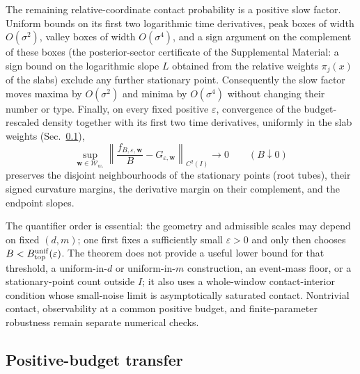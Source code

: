 \documentclass[aps,physrev,reprint,amsmath,amssymb,longbibliography,floatfix]{revtex4-2}
\begin{document}
The remaining relative-coordinate contact probability is a positive slow
factor.  Uniform bounds on its first two logarithmic time derivatives, peak
boxes of width $O(\sigma^2)$, valley boxes of width $O(\sigma^4)$, and a
sign argument on the complement of these boxes (the posterior-sector
certificate of the Supplemental Material: a sign bound on the logarithmic
slope $L$ obtained from the relative weights $\pi_j(x)$ of the slabs)
exclude any further stationary point.  Consequently the slow factor moves maxima by $O(\sigma^2)$ and
minima by $O(\sigma^4)$ without changing their number or type.  Finally, on
every fixed positive $\varepsilon$, convergence of the budget-rescaled
density together with its first two time derivatives, uniformly in the slab
weights (Sec.~\ref{sec:transfer}),
\begin{equation}
 \sup_{\bm w\in\mathcal W_{w_*}}
 \left\|\frac{f_{B,\varepsilon,\bm w}}{B}
       -G_{\varepsilon,\bm w}\right\|_{C^2(I)}
 \longrightarrow0
 \qquad (B\downarrow0)
 \label{eq:exact-m-weak-budget}
\end{equation}
preserves the disjoint neighbourhoods of the stationary points (root
tubes), their signed curvature margins, the derivative margin on their
complement, and the endpoint slopes.

The quantifier order is essential: the geometry and admissible scales may
depend on fixed $(d,m)$; one first fixes a sufficiently small
$\varepsilon>0$ and only then chooses
$B<B_{\rm top}^{\rm unif}(\varepsilon)$.  The theorem does not provide a
useful lower bound for that threshold, a uniform-in-$d$ or uniform-in-$m$
construction, an event-mass floor, or a stationary-point count outside $I$;
it also uses a whole-window contact-interior condition whose small-noise limit
is asymptotically saturated contact.  Nontrivial contact, observability at a
common positive budget, and finite-parameter robustness remain separate
numerical checks.

\subsection{Positive-budget transfer}
\label{sec:transfer}
\end{document}
